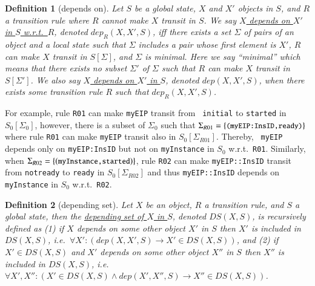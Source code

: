 \documentclass[12pt]{report}
\newtheorem{definition}{Definition}
\newcommand{\ra}{\rightarrow}
\newcommand{\mbstt}[1]{\mbox{\small{\tt {#1}}}}
\newcommand{\ul}{\underline}
\begin{document}
\begin{definition}[depends on]
Let $S$ be a global state, $X$ and $X'$ objects in $S$\!, and $R$
a transition rule where $R$ cannot make $X$ transit in $S$\!.  We say
\ul{$X$ depends on $X'$ in $S$ w.r.t.\ $R$}, denoted \ul{$\mathit{dep}_R(X,
  X',S)$}, iff there exists a set $\Sigma$ of pairs of an object and a
local state such that $\Sigma$ includes a pair whose first element is
$X'$, $R$ can make $X$ transit in $S[\Sigma]$, and $\Sigma$ is
minimal.  Here we say ``minimal'' which means that there exists no
subset $\Sigma'$ of $\Sigma$ such that $R$ can make $X$ transit in
$S[\Sigma']$. We also say \ul{$X$ depends on $X'$ in $S$}\!, denoted
\ul{$\mathit{dep}(X, X',S)$}, when there exists some transition rule $R$ such
that $\mathit{dep}_R(X,X',S)$.
\end{definition}
For example, rule {\tt R01} can make {\tt myEIP} transit from {\tt
  initial} to {\tt started} in $\mathit{S_0}[\Sigma_0]$, however, there is a
subset of $\Sigma_0$ such that
$\Sigma_{R01}=\{\mbstt{(myEIP:InsID,ready)}\}$ where rule {\tt R01}
can make {\tt myEIP} transit also in $\mathit{S_0}[\Sigma_{R01}]$. Thereby, {\tt
  myEIP} depends only on {\tt myEIP:InsID} but not on {\tt myInstance}
in $\mathit{S_0}$ w.r.t.\ {\tt R01}. Similarly, when
$\Sigma_{R02}=\{(\mbstt{myInstance,started})\}$, rule {\tt R02} can
make {\tt myEIP::InsID} transit from {\tt notready} to {\tt ready} in
$\mathit{S_0}[\Sigma_{R02}]$ and thus {\tt myEIP::InsID} depends on {\tt
  myInstance} in $\mathit{S_0}$ w.r.t.\ {\tt R02}.

\begin{definition}[depending set]
Let $X$ be an object, $R$ a transition rule, and $S$ a global
state, then the \ul{depending set of $X$ in $S$}\!, denoted
\ul{$DS(X,S)$}, is recursively defined as (1) if $X$ depends on some
other object $X'$ in $S$ then $X'$ is included in
$DS(X,S)$, i.e.\ $\forall X': (\mathit{dep}(X,X',S) \ra X'\in DS(X,S))$, and
(2) if $X' \in DS(X,S)$ and $X'$ depends on some other object $X''$
in $S$ then $X''$ is included in $DS(X,S)$, i.e.\ $\forall
X',X'': (X'\in DS(X,S) \land \mathit{dep}(X',X'',S) \ra X''\in DS(X,S))$.
\end{definition}
\end{document}
